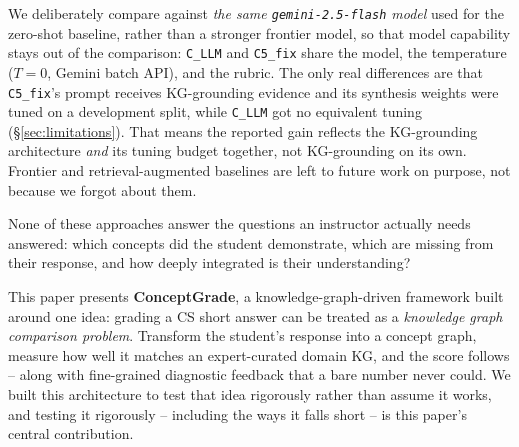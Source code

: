 \documentclass[conference]{IEEEtran}
\begin{document}
We deliberately compare against \emph{the same
\texttt{gemini-2.5-flash} model} used for the zero-shot baseline,
rather than a stronger frontier model, so that model capability stays
out of the comparison: \texttt{C\_LLM} and \texttt{C5\_fix} share the
model, the temperature ($T=0$, Gemini batch API), and the rubric. The
only real differences are that \texttt{C5\_fix}'s prompt receives
KG-grounding evidence and its synthesis weights were tuned on a
development split, while \texttt{C\_LLM} got no equivalent tuning
(\S\ref{sec:limitations}). That means the reported gain reflects the
KG-grounding architecture \emph{and} its tuning budget together, not
KG-grounding on its own. Frontier and retrieval-augmented baselines
are left to future work on purpose, not because we forgot about them.

None of these approaches answer the questions an instructor actually
needs answered: which concepts did the student demonstrate, which are
missing from their response, and how deeply integrated is their
understanding?

This paper presents \textbf{ConceptGrade}, a knowledge-graph-driven
framework built around one idea: grading a CS short answer can be
treated as a \emph{knowledge graph comparison problem}. Transform the
student's response into a concept graph, measure how well it matches
an expert-curated domain KG, and the score follows -- along with
fine-grained diagnostic feedback that a bare number never could. We
built this architecture to test that idea rigorously rather than
assume it works, and testing it rigorously -- including the ways it
falls short -- is this paper's central contribution.
\end{document}
